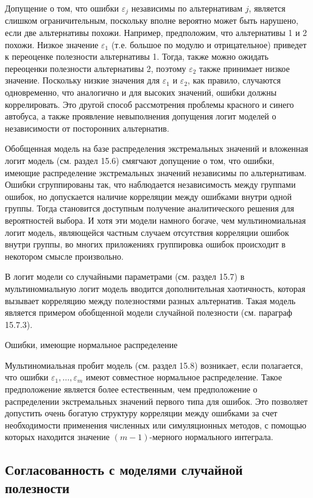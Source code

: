 Допущение о том, что ошибки ${\varepsilon }_j$ независимы по альтернативам $j$, является слишком ограничительным, поскольку вполне вероятно может быть нарушено, если две альтернативы похожи. Например, предположим, что альтернативы 1 и 2 похожи. Низкое значение ${\varepsilon }_1$ (т.е. большое по модулю и отрицательное) приведет к переоценке полезности альтернативы 1. Тогда, также можно ожидать переоценки полезности альтернативы 2, поэтому ${\varepsilon }_2$ также принимает низкое значение. Поскольку низкие значения для ${\varepsilon }_1$ и ${\varepsilon }_2$, как правило, случаются одновременно, что аналогично и для высоких значений, ошибки должны коррелировать. Это другой способ рассмотрения проблемы красного и синего автобуса, а также проявление невыполнения допущения логит моделей о независимости от посторонних альтернатив.

Обобщенная модель на базе распределения экстремальных значений и вложенная логит модель (см. раздел 15.6) смягчают допущение о том, что ошибки, имеющие распределение экстремальных значений независимы по альтернативам. Ошибки сгруппированы так, что наблюдается независимость между группами ошибок, но допускается наличие корреляции между ошибками внутри одной группы. Тогда становится доступным получение аналитического решения для вероятностей выбора. И хотя эти модели намного богаче, чем мультиномиальная логит модель, являющейся частным случаем  отсутствия корреляции ошибок внутри группы, во многих приложениях группировка ошибок происходит в некотором смысле произвольно.

В логит модели со случайными параметрами (см. раздел 15.7) в мультиномиальную логит модель вводится дополнительная хаотичность, которая вызывает корреляцию между полезностями разных альтернатив. Такая модель является примером обобщенной модели случайной полезности (см. параграф 15.7.3).

Ошибки, имеющие нормальное распределение

Мультиномиальная пробит модель (см. раздел 15.8) возникает, если полагается, что ошибки ${\varepsilon }_1,\dots ,{\varepsilon }_m$ имеют совместное нормальное распределение. Такое предположение является более естественным, чем предположение о распределении экстремальных значений первого типа для ошибок. Это позволяет допустить очень богатую структуру корреляции между ошибками за счет необходимости применения численных или симуляционных методов, с помощью которых находится значение $(m-1)$-мерного нормального интеграла.

\subsection{Согласованность с моделями случайной полезности}

